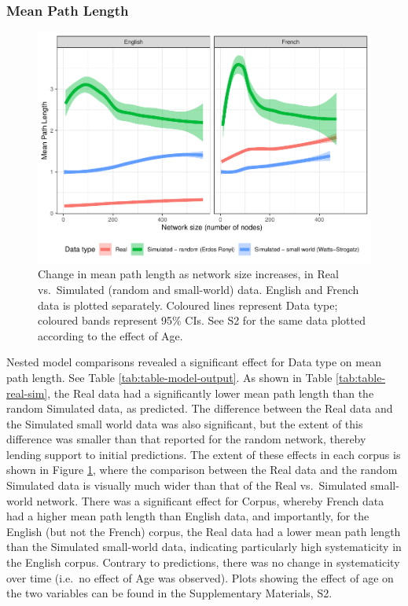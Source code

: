 \documentclass[
  man]{apa6}
\begin{document}
\subsubsection{Mean Path Length}\label{mean-path-length}

\begin{figure}
\centering
\includegraphics{NetworkGraphs_R1_files/figure-latex/Figure-path-length-1.pdf}
\caption{\label{fig:Figure-path-length}Change in mean path length as network size increases, in Real vs.~Simulated (random and small-world) data. English and French data is plotted separately. Coloured lines represent Data type; coloured bands represent 95\% CIs. See S2 for the same data plotted according to the effect of Age.}
\end{figure}

Nested model comparisons revealed a significant effect for Data type on mean path length. See Table \ref{tab:table-model-output}. As shown in Table \ref{tab:table-real-sim}, the Real data had a significantly lower mean path length than the random Simulated data, as predicted. The difference between the Real data and the Simulated small world data was also significant, but the extent of this difference was smaller than that reported for the random network, thereby lending support to initial predictions. The extent of these effects in each corpus is shown in Figure \ref{fig:Figure-path-length}, where the comparison between the Real data and the random Simulated data is visually much wider than that of the Real vs.~Simulated small-world network. There was a significant effect for Corpus, whereby French data had a higher mean path length than English data, and importantly, for the English (but not the French) corpus, the Real data had a lower mean path length than the Simulated small-world data, indicating particularly high systematicity in the English corpus. Contrary to predictions, there was no change in systematicity over time (i.e.~no effect of Age was observed). Plots showing the effect of age on the two variables can be found in the Supplementary Materials, S2.
\end{document}
